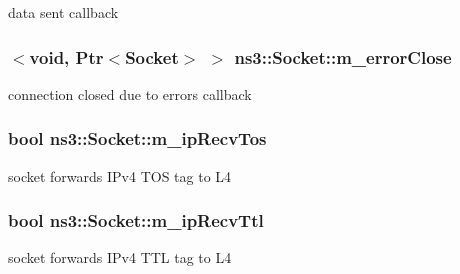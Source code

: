 data sent callback 

\subsubsection[{\texorpdfstring{m\+\_\+error\+Close}{m_errorClose}}]{$<$void, {\bf Ptr}$<${\bf Socket}$>$ $>$ ns3\+::\+Socket\+::m\+\_\+error\+Close\hspace{0.3cm}{\ttfamily [private]}}\hypertarget{classns3_1_1Socket_afc3a4e8c5d4bd0de426197d4874dc8eb}{}\label{classns3_1_1Socket_afc3a4e8c5d4bd0de426197d4874dc8eb}


connection closed due to errors callback 

\subsubsection[{\texorpdfstring{m\+\_\+ip\+Recv\+Tos}{m_ipRecvTos}}]{\setlength{\rightskip}{0pt plus 5cm}bool ns3\+::\+Socket\+::m\+\_\+ip\+Recv\+Tos\hspace{0.3cm}{\ttfamily [private]}}\hypertarget{classns3_1_1Socket_a5fdcc70b383be1f5d4c2e9f5da7e549a}{}\label{classns3_1_1Socket_a5fdcc70b383be1f5d4c2e9f5da7e549a}


socket forwards I\+Pv4 T\+OS tag to L4 

\subsubsection[{\texorpdfstring{m\+\_\+ip\+Recv\+Ttl}{m_ipRecvTtl}}]{\setlength{\rightskip}{0pt plus 5cm}bool ns3\+::\+Socket\+::m\+\_\+ip\+Recv\+Ttl\hspace{0.3cm}{\ttfamily [private]}}\hypertarget{classns3_1_1Socket_aa742eaabf3d9afdc77710a698e6ec681}{}\label{classns3_1_1Socket_aa742eaabf3d9afdc77710a698e6ec681}


socket forwards I\+Pv4 T\+TL tag to L4 

